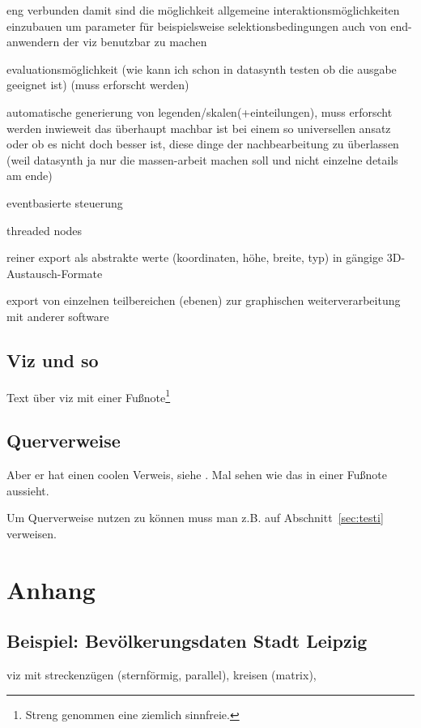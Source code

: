 \documentclass[a4paper, 12pt, onepage, pdftex, headsepline, footsepline]{scrreprt}
\begin{document}
eng verbunden damit sind die möglichkeit allgemeine interaktionsmöglichkeiten einzubauen um parameter für beispielsweise selektionsbedingungen auch von end-anwendern der viz benutzbar zu machen

evaluationsmöglichkeit (wie kann ich schon in datasynth testen ob die ausgabe geeignet ist) (muss erforscht werden)

automatische generierung von legenden/skalen(+einteilungen), muss erforscht werden inwieweit das überhaupt machbar ist bei einem so universellen ansatz oder ob es nicht doch besser ist, diese dinge der nachbearbeitung zu überlassen (weil datasynth ja nur die massen-arbeit machen soll und nicht einzelne details am ende)

eventbasierte steuerung

threaded nodes

reiner export als abstrakte werte (koordinaten, höhe, breite, typ) in gängige 3D-Austausch-Formate

export von einzelnen teilbereichen (ebenen) zur graphischen weiterverarbeitung mit anderer software

\section*{Viz und so}

Text über viz mit einer Fußnote\footnote{Streng genommen eine ziemlich sinnfreie.}

\section*{Querverweise}

Aber er hat einen coolen Verweis, siehe .
Mal sehen wie das in einer Fußnote aussieht.

Um Querverweise nutzen zu können muss man z.B. auf Abschnitt~\ref{sec:testi} verweisen.



\listoftables
\listoffigures
\chapter{Anhang}
\section{Beispiel: Bevölkerungsdaten Stadt Leipzig}
viz mit streckenzügen (sternförmig, parallel), kreisen (matrix),
\end{document}
